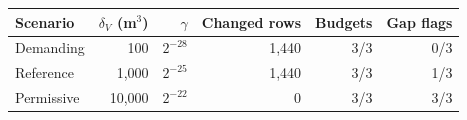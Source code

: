 \begin{tabular}{lrrrrr}
\toprule
Scenario & $\delta_V$ (m$^3$) & $\gamma$ & Changed rows & Budgets & Gap flags\\
\midrule
Demanding & 100 & $2^{-28}$ & 1,440 & 3/3 & 0/3\\
Reference & 1,000 & $2^{-25}$ & 1,440 & 3/3 & 1/3\\
Permissive & 10,000 & $2^{-22}$ & 0 & 3/3 & 3/3\\
\bottomrule
\end{tabular}
